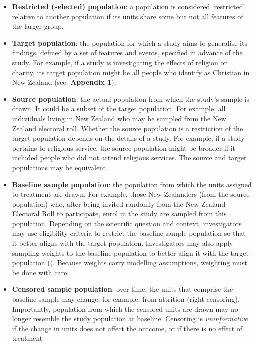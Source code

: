 \documentclass[
  singlecolumn]{article}
\begin{document}
\begin{itemize}
\item
  \textbf{Restricted (selected) population}: a population is considered
  `restricted' relative to another population if its units share some
  but not all features of the larger group.
\item
  \textbf{Target population}: the population for which a study aims to
  generalise its findings, defined by a set of features and events,
  specified in advance of the study. For example, if a study is
  investigating the effects of religion on charity, its target
  population might be all people who identify as Christian in New
  Zealand (see; \textbf{Appendix 1}).
\item
  \textbf{Source population}: the actual population from which the
  study's sample is drawn. It could be a subset of the target
  population. For example, all individuals living in New Zealand who may
  be sampled from the New Zealand electoral roll. Whether the source
  population is a restriction of the target population depends on the
  details of a study. For example, if a study pertains to religious
  service, the source population might be broader if it included people
  who did not attend religious services. The source and target
  populations may be equivalent.
\item
  \textbf{Baseline sample population}: the population from which the
  units assigned to treatment are drawn. For example, those New
  Zealanders (from the source population) who, after being invited
  randomly from the New Zealand Electoral Roll to participate, enrol in
  the study are sampled from this population. Depending on the
  scientific question and context, investigators may use eligibility
  criteria to restrict the baseline sample population so that it better
  aligns with the target population. Investigators may also apply
  sampling weights to the baseline population to better align it with
  the target population (). Because weights carry modelling assumptions, weighting
  must be done with care.
\item
  \textbf{Censored sample population}: over time, the units that
  comprise the baseline sample may change, for example, from attrition
  (right censoring). Importantly, population from which the censored
  units are drawn may no longer resemble the study population at
  baseline. Censoring is \emph{uninformative} if the change in units
  does not affect the outcome, or if there is no effect of treatment

\end{itemize}
\end{document}
